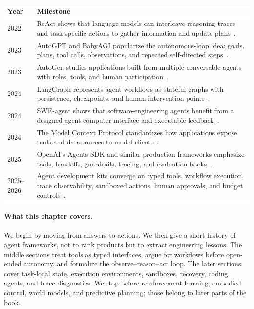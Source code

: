 \begin{center}
\begin{tabularx}{\textwidth}{@{}lX@{}}
\toprule
\textbf{Year} & \textbf{Milestone} \\
\midrule
2022 & ReAct shows that language models can interleave reasoning traces and task-specific actions to gather information and update plans~\cite{yao2023react}. \\
2023 & AutoGPT and BabyAGI popularize the autonomous-loop idea: goals, plans, tool calls, observations, and repeated self-directed steps~\cite{autogpt2023,babyagi2023}. \\
2023 & AutoGen studies applications built from multiple conversable agents with roles, tools, and human participation~\cite{wu2023autogen}. \\
2024 & LangGraph represents agent workflows as stateful graphs with persistence, checkpoints, and human intervention points~\cite{langgraph2026persistence}. \\
2024 & SWE-agent shows that software-engineering agents benefit from a designed agent-computer interface and executable feedback~\cite{yang2024sweagent}. \\
2024 & The Model Context Protocol standardizes how applications expose tools and data sources to model clients~\cite{anthropic2024mcp,mcp2026spec}. \\
2025 & OpenAI's Agents SDK and similar production frameworks emphasize tools, handoffs, guardrails, tracing, and evaluation hooks~\cite{openai2025agents,openai2026agentssdkdocs}. \\
2025--2026 & Agent development kits converge on typed tools, workflow execution, trace observability, sandboxed actions, human approvals, and budget controls~\cite{google2026adk,openai2026agentssdkdocs}. \\
\bottomrule
\end{tabularx}
\end{center}

\paragraph{What this chapter covers.} We begin by moving from answers to actions. We then give a short history of agent frameworks, not to rank products but to extract engineering lessons. The middle sections treat tools as typed interfaces, argue for workflows before open-ended autonomy, and formalize the observe--reason--act loop. The later sections cover task-local state, execution environments, sandboxes, recovery, coding agents, and trace diagnostics. We stop before reinforcement learning, embodied control, world models, and predictive planning; those belong to later parts of the book.


